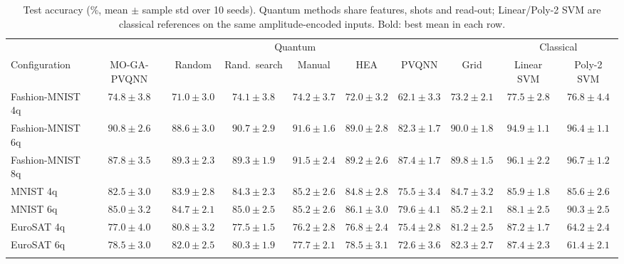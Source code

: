 \begin{table}[t]
\caption{Test accuracy (\%, mean $\pm$ sample std over 10 seeds). Quantum methods share features, shots and read-out; Linear/Poly-2 SVM are classical references on the same amplitude-encoded inputs. Bold: best mean in each row.}\label{tab:main}
\scriptsize\setlength\tabcolsep{3pt}
\begin{tabular}{@{}lccccccccc@{}}
\toprule
 & \multicolumn{7}{c}{Quantum} & \multicolumn{2}{c}{Classical} \\
Configuration & MO-GA-PVQNN & Random & Rand.~search & Manual & HEA & PVQNN & Grid & Linear SVM & Poly-2 SVM \\
\midrule
Fashion-MNIST 4q & $74.8\pm3.8$ & $71.0\pm3.0$ & $74.1\pm3.8$ & $74.2\pm3.7$ & $72.0\pm3.2$ & $62.1\pm3.3$ & $73.2\pm2.1$ & $\mathbf{77.5\pm2.8}$ & $76.8\pm4.4$ \\
Fashion-MNIST 6q & $90.8\pm2.6$ & $88.6\pm3.0$ & $90.7\pm2.9$ & $91.6\pm1.6$ & $89.0\pm2.8$ & $82.3\pm1.7$ & $90.0\pm1.8$ & $94.9\pm1.1$ & $\mathbf{96.4\pm1.1}$ \\
Fashion-MNIST 8q & $87.8\pm3.5$ & $89.3\pm2.3$ & $89.3\pm1.9$ & $91.5\pm2.4$ & $89.2\pm2.6$ & $87.4\pm1.7$ & $89.8\pm1.5$ & $96.1\pm2.2$ & $\mathbf{96.7\pm1.2}$ \\
MNIST 4q & $82.5\pm3.0$ & $83.9\pm2.8$ & $84.3\pm2.3$ & $85.2\pm2.6$ & $84.8\pm2.8$ & $75.5\pm3.4$ & $84.7\pm3.2$ & $\mathbf{85.9\pm1.8}$ & $85.6\pm2.6$ \\
MNIST 6q & $85.0\pm3.2$ & $84.7\pm2.1$ & $85.0\pm2.5$ & $85.2\pm2.6$ & $86.1\pm3.0$ & $79.6\pm4.1$ & $85.2\pm2.1$ & $88.1\pm2.5$ & $\mathbf{90.3\pm2.5}$ \\
EuroSAT 4q & $77.0\pm4.0$ & $80.8\pm3.2$ & $77.5\pm1.5$ & $76.2\pm2.8$ & $76.8\pm2.4$ & $75.4\pm2.8$ & $81.2\pm2.5$ & $\mathbf{87.2\pm1.7}$ & $64.2\pm2.4$ \\
EuroSAT 6q & $78.5\pm3.0$ & $82.0\pm2.5$ & $80.3\pm1.9$ & $77.7\pm2.1$ & $78.5\pm3.1$ & $72.6\pm3.6$ & $82.3\pm2.7$ & $\mathbf{87.4\pm2.3}$ & $61.4\pm2.1$ \\
\botrule
\end{tabular}
\end{table}
